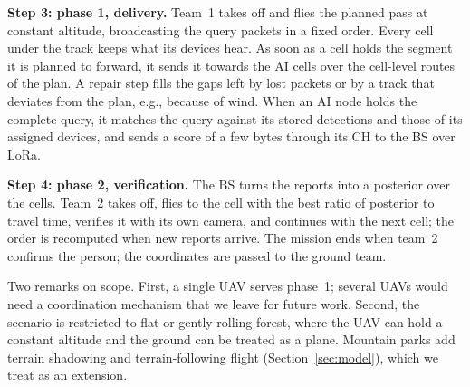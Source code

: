 \textbf{Step 3: phase 1, delivery.} Team~1 takes off and flies the planned pass at constant altitude, broadcasting the
query packets in a fixed order. Every cell under the track keeps what its devices hear. As soon as a cell holds the
segment it is planned to forward, it sends it towards the AI cells over the cell-level routes of the plan. A repair
step fills the gaps left by lost packets or by a track that deviates from the plan, e.g., because of wind. When an AI
node holds the complete query, it matches the query against its stored detections and those of its assigned devices,
and sends a score of a few bytes through its CH to the BS over LoRa.

\textbf{Step 4: phase 2, verification.} The BS turns the reports into a posterior over the cells. Team~2 takes off,
flies to the cell with the best ratio of posterior to travel time, verifies it with its own camera, and continues with
the next cell; the order is recomputed when new reports arrive. The mission ends when team~2 confirms the person; the
coordinates are passed to the ground team.

Two remarks on scope. First, a single UAV serves phase~1; several UAVs would need a coordination mechanism that we leave
for future work. Second, the scenario is restricted to flat or gently rolling forest, where the UAV can hold a constant
altitude and the ground can be treated as a plane. Mountain parks add terrain shadowing and terrain-following flight
(Section~\ref{sec:model}), which we treat as an extension.
